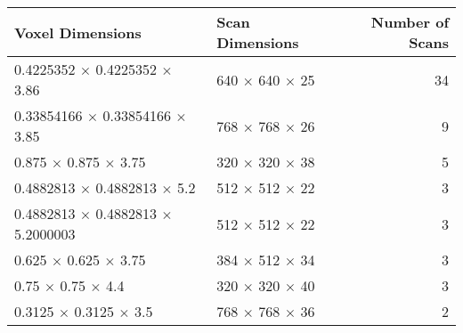 
\begin{table}[H]
  \tiny
  \begin{tabularx}{\textwidth}{X X r}
    Voxel Dimensions & Scan Dimensions & Number of Scans \\\hline
    \num{0.4225352} $ \times $ \num{0.4225352} $ \times $ \num{3.86}         &   \num[minimum-decimal-digits=0,drop-zero-decimal]{640} $ \times $ \num[minimum-decimal-digits=0,drop-zero-decimal]{640} $ \times $ \num[minimum-decimal-digits=0,drop-zero-decimal]{25}  & 34\\
    \num{0.33854166} $ \times $ \num{0.33854166} $ \times $ \num{3.85}       &   \num[minimum-decimal-digits=0,drop-zero-decimal]{768} $ \times $ \num[minimum-decimal-digits=0,drop-zero-decimal]{768} $ \times $ \num[minimum-decimal-digits=0,drop-zero-decimal]{26}  & 9\\
    \num{0.875} $ \times $ \num{0.875} $ \times $ \num{3.75}                 &   \num[minimum-decimal-digits=0,drop-zero-decimal]{320} $ \times $ \num[minimum-decimal-digits=0,drop-zero-decimal]{320} $ \times $ \num[minimum-decimal-digits=0,drop-zero-decimal]{38}  & 5\\
    \num{0.4882813} $ \times $ \num{0.4882813} $ \times $ \num{5.2}          &   \num[minimum-decimal-digits=0,drop-zero-decimal]{512} $ \times $ \num[minimum-decimal-digits=0,drop-zero-decimal]{512} $ \times $ \num[minimum-decimal-digits=0,drop-zero-decimal]{22}  & 3\\
    \num{0.4882813} $ \times $ \num{0.4882813} $ \times $ \num{5.2000003}    &   \num[minimum-decimal-digits=0,drop-zero-decimal]{512} $ \times $ \num[minimum-decimal-digits=0,drop-zero-decimal]{512} $ \times $ \num[minimum-decimal-digits=0,drop-zero-decimal]{22}  & 3\\
    \num{0.625} $ \times $ \num{0.625} $ \times $ \num{3.75}                 &   \num[minimum-decimal-digits=0,drop-zero-decimal]{384} $ \times $ \num[minimum-decimal-digits=0,drop-zero-decimal]{512} $ \times $ \num[minimum-decimal-digits=0,drop-zero-decimal]{34}  & 3\\
    \num{0.75} $ \times $ \num{0.75} $ \times $ \num{4.4}                    &   \num[minimum-decimal-digits=0,drop-zero-decimal]{320} $ \times $ \num[minimum-decimal-digits=0,drop-zero-decimal]{320} $ \times $ \num[minimum-decimal-digits=0,drop-zero-decimal]{40}  & 3\\
    \num{0.3125} $ \times $ \num{0.3125} $ \times $ \num{3.5}                &   \num[minimum-decimal-digits=0,drop-zero-decimal]{768} $ \times $ \num[minimum-decimal-digits=0,drop-zero-decimal]{768} $ \times $ \num[minimum-decimal-digits=0,drop-zero-decimal]{36}  & 2\\

\end{tabularx}
\end{table}
